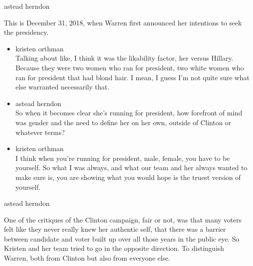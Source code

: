 astead herndon

This is December 31, 2018, when Warren first announced her intentions to
seek the presidency.

\begin{itemize}
\item
  kristen orthman\\
  Talking about like, I think it was the likability factor, her versus
  Hillary. Because they were two women who ran for president, two white
  women who ran for president that had blond hair. I mean, I guess I'm
  not quite sure what else warranted necessarily that.
\item
  astead herndon\\
  So when it becomes clear she's running for president, how forefront of
  mind was gender and the need to define her on her own, outside of
  Clinton or whatever terms?
\item
  kristen orthman\\
  I think when you're running for president, male, female, you have to
  be yourself. So what I was always, and what our team and her always
  wanted to make sure is, you are showing what you would hope is the
  truest version of yourself.
\end{itemize}

astead herndon

One of the critiques of the Clinton campaign, fair or not, was that many
voters felt like they never really knew her authentic self, that there
was a barrier between candidate and voter built up over all those years
in the public eye. So Kristen and her team tried to go in the opposite
direction. To distinguish Warren, both from Clinton but also from
everyone else.

